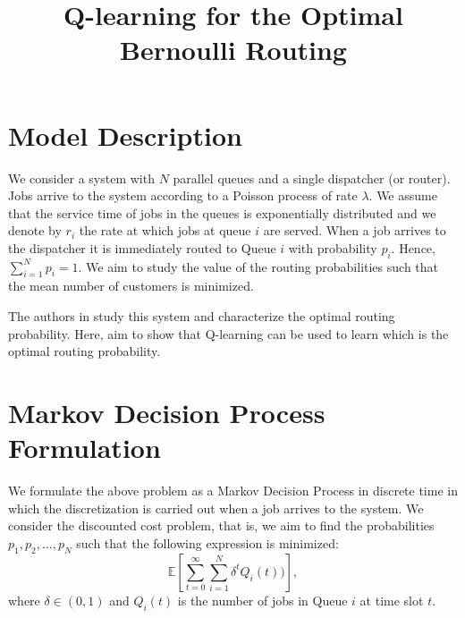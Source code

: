 \documentclass[a4paper,11pt]{article}
\title{Q-learning for the Optimal Bernoulli Routing}
\begin{document}
\author{}
\date{}

\maketitle

\section*{Model Description}

We consider a system with $N$ parallel queues and a single dispatcher (or router). 
Jobs arrive to the system according to a Poisson process of rate $\lambda$. We assume
that the service time of jobs in the queues is exponentially distributed and we denote by
$r_i$ the rate at which jobs at queue $i$ are served. When a job arrives to the dispatcher
it is immediately routed to Queue $i$ with probability $p_i$. Hence, $\sum_{i=1}^Np_i=1$. We aim to study the value of the routing probabilities such that the mean number of customers is minimized.
 
The authors in \cite{AAP11} study this system and 
characterize the optimal routing probability. Here, aim to show that Q-learning can 
be used to learn which is the optimal routing probability. 

\section*{Markov Decision Process Formulation}

We formulate the above problem as a Markov Decision Process in discrete time in which 
the discretization is carried out when a job arrives to the system. We consider the discounted cost problem, that is, we aim to find the probabilities $p_1,p_2,\dots,p_N$ such that the following expression is minimized:
 \begin{equation}
\mathbb E\left[\sum_{t=0}^\infty \sum_{i=1}^N\delta^t Q_i(t))\right],
\end{equation}
where $\delta\in(0,1)$ and $Q_i(t)$ is the number of jobs in Queue $i$ at time slot $t$.
\end{document}
